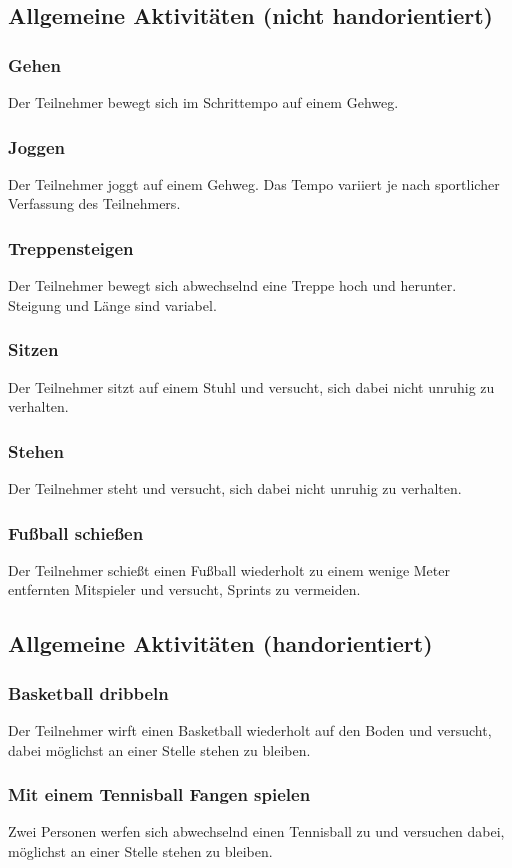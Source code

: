 \subsection{Allgemeine Aktivitäten (nicht handorientiert)}
\subsubsection{Gehen}
Der Teilnehmer bewegt sich im Schrittempo auf einem Gehweg.
\subsubsection{Joggen}
Der Teilnehmer joggt auf einem Gehweg. Das Tempo variiert je nach sportlicher Verfassung des Teilnehmers.
\subsubsection{Treppensteigen}
Der Teilnehmer bewegt sich abwechselnd eine Treppe hoch und herunter. Steigung und Länge sind variabel.
\subsubsection{Sitzen}
Der Teilnehmer sitzt auf einem Stuhl und versucht, sich dabei nicht unruhig zu verhalten.
\subsubsection{Stehen}
Der Teilnehmer steht und versucht, sich dabei nicht unruhig zu verhalten.
\subsubsection{Fußball schießen}
Der Teilnehmer schießt einen Fußball wiederholt zu einem wenige Meter entfernten Mitspieler und versucht, Sprints zu vermeiden.

\subsection{Allgemeine Aktivitäten (handorientiert)}
\subsubsection{Basketball dribbeln}
Der Teilnehmer wirft einen Basketball wiederholt auf den Boden und versucht, dabei möglichst an einer Stelle stehen zu bleiben.
\subsubsection{Mit einem Tennisball Fangen spielen}
Zwei Personen werfen sich abwechselnd einen Tennisball zu und versuchen dabei, möglichst an einer Stelle stehen zu bleiben.
